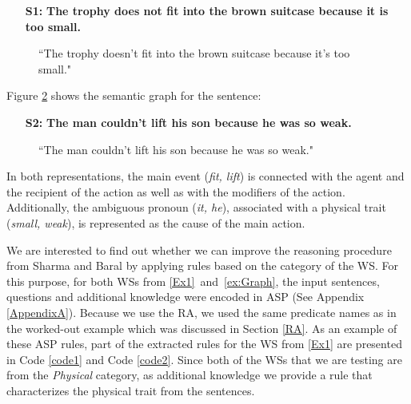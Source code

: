 \begin{itemize}
	\item[\textbf{S1:}] \textbf{The trophy does not fit into the brown suitcase because it is too small.}
\end{itemize}
\begin{figure} [h!]
	\centering
	
	\caption{\label{Graph1}``The trophy doesn't fit into the brown suitcase because it's too small."}
\end{figure}

Figure \ref{Graph2} shows the semantic graph for the sentence:

\begin{itemize}
	\item[\textbf{S2:}] \textbf{The man couldn't lift his son because he was so weak.}
\end{itemize} 


\begin{figure}[h!]
	\centering
	
	\caption{\label{Graph2}``The man couldn't lift his son because he was so weak."}
\end{figure}

In both representations, the main event (\textit{fit, lift}) is connected with the agent and the recipient of the action as well as with the modifiers of the action. Additionally, the ambiguous pronoun (\textit{it, he}),  associated with a physical trait (\textit{small, weak}), is represented as the cause of the main action. 

We are interested to find out whether we can improve the reasoning procedure from Sharma and Baral \cite{2018CommonsenseKT} 
by applying rules based on the category of the WS. 
For this purpose, for both WSs from \ref{Ex1}~and~\ref{ex:Graph}, the input sentences, questions and additional knowledge were encoded in ASP (See Appendix \ref{AppendixA}). Because we use the RA, we used the same predicate names as in the worked-out example which was discussed in Section \ref{RA}. As an example of these ASP rules, part of the extracted rules for the WS from \ref{Ex1} are presented in Code \ref{code1} and  Code \ref{code2}. 
Since both of the WSs that we are testing are from the \textit{Physical} category, as additional knowledge we provide a rule that characterizes the physical trait from the sentences. 

